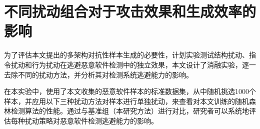 
\section{不同扰动组合对于攻击效果和生成效率的影响}

为了评估本文提出的多架构对抗性样本生成的必要性，计划实验测试结构扰动、指令扰动和行为扰动在逃避恶意软件检测中的独立效果，本文设计了消融实验，逐一去除不同的扰动方法，并分析其对检测系统逃避能力的影响。


在本实验中，使用了本文收集的恶意软件样本的标准数据集，从中随机挑选1000个样本，并应用以下三种扰动方法对样本进行单独扰动，来查看对本文训练的随机森林检测算法的性能。通过与基准组（本研究方法）进行对比，研究者可以系统地评估每种扰动策略对恶意软件检测逃避能力的影响。


